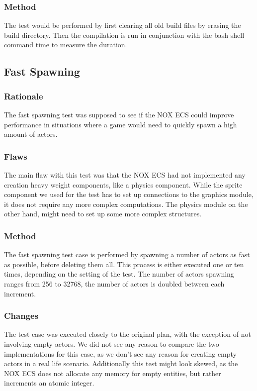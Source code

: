 \subsubsection{Method}
The test would be performed by first clearing all old build files by erasing the build directory.
Then the compilation is run in conjunction with the bash shell command time to measure the duration.

\subsection{Fast Spawning}
\label{subsec:test_cases_fast_spawning}
\subsubsection{Rationale}
The fast spawning test was supposed to see if the NOX ECS could improve performance in situations where a game would need to quickly
spawn a high amount of actors.

\subsubsection{Flaws}
The main flaw with this test was that the NOX ECS had not implemented any creation heavy weight components, like a physics component.
While the sprite component we used for the test has to set up connections to the graphics module, it does not require any more complex
computations. The physics module on the other hand, might need to set up some more complex structures.

\subsubsection{Method}
\label{subsubsec:test_cases_fast_spawning_method}
The fast spawning test case is performed by spawning a number of actors as fast as possible, before deleting them all.
This process is either executed one or ten times, depending on the setting of the test.
The number of actors spawning ranges from 256 to 32768, the number of actors is doubled between each increment.

\subsubsection{Changes}
\label{subsubsec:test_cases_fast_spawning_changes}
The test case was executed closely to the original plan, with the exception of not involving empty actors.
We did not see any reason to compare the two implementations for this case, as we don't see any reason for creating empty actors in a real life scenario.
Additionally this test might look skewed, as the NOX ECS does not allocate any memory for empty entities, but rather increments an atomic integer.

